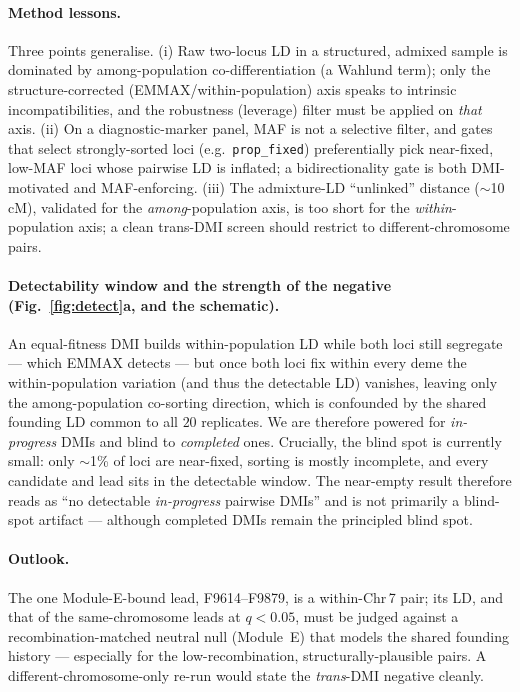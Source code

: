\documentclass[11pt]{article}
\begin{document}
\paragraph{Method lessons.}
Three points generalise. (i) Raw two-locus LD in a structured, admixed sample is dominated by among-population
co-differentiation (a Wahlund term); only the structure-corrected (EMMAX/within-population) axis speaks to intrinsic
incompatibilities, and the robustness (leverage) filter must be applied on \emph{that} axis. (ii) On a diagnostic-marker
panel, MAF is not a selective filter, and gates that select strongly-sorted loci (e.g.\ \texttt{prop\_fixed}) preferentially
pick near-fixed, low-MAF loci whose pairwise LD is inflated; a bidirectionality gate is both DMI-motivated and MAF-enforcing.
(iii) The admixture-LD ``unlinked'' distance ($\sim$10\,cM), validated for the \emph{among}-population axis, is too short for
the \emph{within}-population axis; a clean trans-DMI screen should restrict to different-chromosome pairs.

\paragraph{Detectability window and the strength of the negative (Fig.~\ref{fig:detect}a, and the schematic).}
An equal-fitness DMI builds within-population LD while both loci still segregate --- which EMMAX detects --- but once both
loci fix within every deme the within-population variation (and thus the detectable LD) vanishes, leaving only the
among-population co-sorting direction, which is confounded by the shared founding LD common to all $20$ replicates. We are
therefore powered for \emph{in-progress} DMIs and blind to \emph{completed} ones. Crucially, the blind spot is currently
small: only $\sim$1\% of loci are near-fixed, sorting is mostly incomplete, and every candidate and lead sits in the
detectable window. The near-empty result therefore reads as ``no detectable \emph{in-progress} pairwise DMIs'' and is not
primarily a blind-spot artifact --- although completed DMIs remain the principled blind spot.

\paragraph{Outlook.}
The one Module-E-bound lead, F9614--F9879, is a within-Chr\,7 pair; its LD, and that of the same-chromosome leads at
$q<0.05$, must be judged against a recombination-matched neutral null (Module~E) that models the shared founding history
--- especially for the low-recombination, structurally-plausible pairs. A different-chromosome-only re-run would state the
\emph{trans}-DMI negative cleanly.
\end{document}
